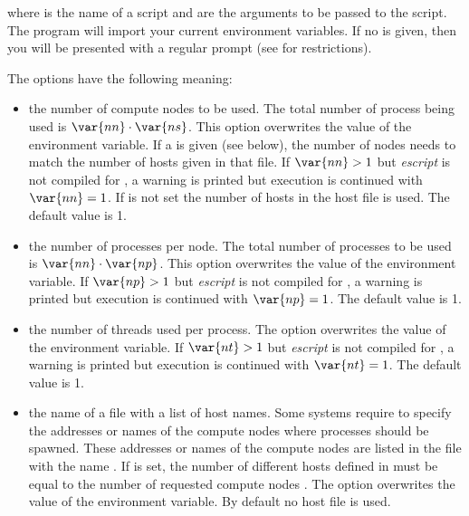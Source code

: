 where  is the name of a script and  are the arguments to
be passed to the script.
The  program will import your current environment variables. 
If no  is given, then you will be presented with a regular \PYTHON
prompt (see  for restrictions).

The options have the following meaning:
\begin{itemize}
\item[\programopt{-n} \var{nn}] the number of compute nodes  to be used.
    The total number of process being used is $\var{nn} \cdot \var{ns}$.
    This option overwrites the value of the 
    environment variable. 
    If a  is given (see below), the number of nodes needs to
    match the number of hosts given in that file.
    If $\var{nn}>1$ but {\it escript} is not compiled for \MPI, a warning is
    printed but execution is continued with $\var{nn}=1$.
    If  is not set the number of hosts in the host file is
    used. The default value is 1.
 
\item[\programopt{-p} \var{np}] the number of \MPI processes per node.
    The total number of processes to be used is $\var{nn} \cdot \var{np}$.
    This option overwrites the value of the 
    environment variable.
    If $\var{np}>1$ but {\it escript} is not compiled for \MPI, a warning is
    printed but execution is continued with $\var{np}=1$.
    The default value is 1.

\item[\programopt{-t} \var{nt}] the number of threads used per process.
    The option overwrites the value of the 
    environment variable.
    If $\var{nt}>1$ but {\it escript} is not compiled for \OPENMP, a warning
    is printed but execution is continued with $\var{nt}=1$.
    The default value is 1.

\item[\programopt{-f} \var{hostfile}] the name of a file with a list of host names.
    Some systems require to specify the addresses or names of the compute
    nodes where \MPI processes should be spawned.
    These addresses or names of the compute nodes are listed in the file with
    the name .
    If  is set, the number of different hosts defined in 
    must be equal to the number of requested compute nodes .
    The option overwrites the value of the  environment
    variable. By default no host file is used.


\end{itemize}
